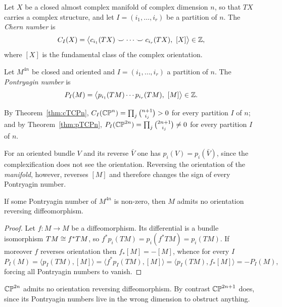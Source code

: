 \begin{definition}
Let $X$ be a closed almost complex manifold of complex dimension $n$, so that
$TX$ carries a complex structure, and let $I=(i_1,\dots,i_r)$ be a partition of
$n$. The \emph{Chern number} is
\[
C_I(X)=\big\langle c_{i_1}(TX)\smile\cdots\smile c_{i_r}(TX),\ [X]\big\rangle
\in\mathbb{Z},
\]
where $[X]$ is the fundamental class of the complex orientation.
\end{definition}

\begin{definition}
Let $M^{4n}$ be closed and oriented and $I=(i_1,\dots,i_r)$ a partition of $n$.
The \emph{Pontryagin number} is
\[
P_I(M)=\big\langle p_{i_1}(TM)\cdots p_{i_r}(TM),\ [M]\big\rangle\in\mathbb{Z} .
\]
\end{definition}

\begin{example}
By Theorem~\ref{thm:cTCPn}, $C_I(\mathbb{CP}^n)=\prod_j\binom{n+1}{i_j}>0$ for every
partition $I$ of $n$; and by Theorem~\ref{thm:pTCPn},
$P_I(\mathbb{CP}^{2n})=\prod_j\binom{2n+1}{i_j}\neq0$ for every partition $I$ of $n$.
\end{example}

\begin{remark}
For an oriented bundle $V$ and its reverse $\bar V$ one has $p_i(V)=p_i(\bar V)$,
since the complexification does not see the orientation. Reversing the
orientation of the \emph{manifold}, however, reverses $[M]$ and therefore
changes the sign of every Pontryagin number.
\end{remark}

\begin{lemma}\label{lem:no-orientation-reversal}
If some Pontryagin number of $M^{4n}$ is non-zero, then $M$ admits no
orientation reversing diffeomorphism.
\end{lemma}

\begin{proof}
Let $f\colon M\to M$ be a diffeomorphism. Its differential is a bundle
isomorphism $TM\cong f^*TM$, so $f^*p_i(TM)=p_i(f^*TM)=p_i(TM)$. If moreover $f$
reverses orientation then $f_*[M]=-[M]$, whence for every $I$
\[
P_I(M)=\big\langle p_I(TM),[M]\big\rangle
=\big\langle f^*p_I(TM),[M]\big\rangle
=\big\langle p_I(TM),f_*[M]\big\rangle
=-P_I(M),
\]
forcing all Pontryagin numbers to vanish.
\end{proof}

\begin{corollary}
$\mathbb{CP}^{2n}$ admits no orientation reversing diffeomorphism. By contrast
$\mathbb{CP}^{2n+1}$ does, since its Pontryagin numbers live in the wrong dimension to
obstruct anything.
\end{corollary}

